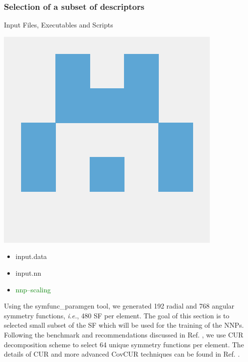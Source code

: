 \documentclass[12pt]{article}
\begin{document}
\subsubsection{Selection of a subset of descriptors}
\begin{mybox2}{{Input Files, Executables and Scripts}}
\begin{minipage}[c]{0.5\linewidth}
\includegraphics[scale=0.1]{latex_files/n2p2.png}
\end{minipage}
\begin{minipage}[c]{0.5\linewidth}
\begin{itemize}
    \item input.data
    \item input.nn
    \item \textcolor{green}{nnp--scaling}
\end{itemize}
\end{minipage}
\end{mybox2}

Using the symfunc\_paramgen tool, we generated 192 radial and 768 angular symmetry functions, \textit{i.e.}, 480 SF per element. The goal of this section is to selected small subset of the SF which will be used for the training of the NNPs. Following the benchmark and recommendations discussed in Ref. , we use CUR decomposition scheme to select 64 unique symmetry functions per element. The details of CUR and more advanced CovCUR techniques can be found in Ref. . 
\end{document}

